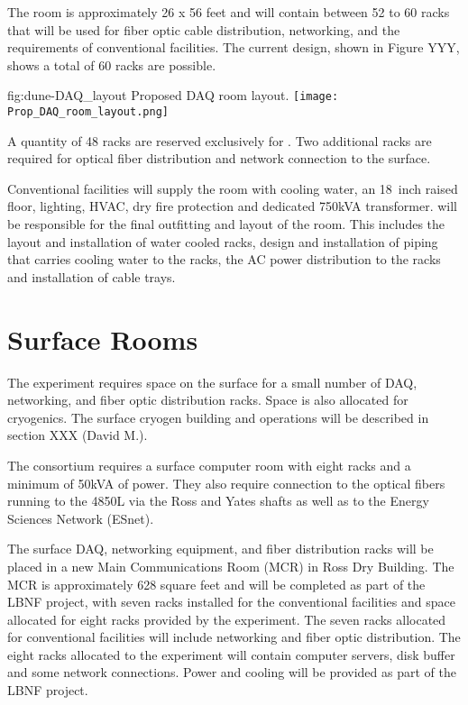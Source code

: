 The  room is approximately 26 x 56 feet and will contain between 52 to 60 racks that will be
used for fiber optic cable distribution, networking, 
 and the requirements of conventional facilities.  The current design, shown in Figure YYY, shows a total of 60 racks are possible.

\begin{dunefigure}{fig:dune-DAQ_layout}
  {Proposed DAQ room layout.}
  \texttt{[image: Prop\_DAQ\_room\_layout.png]}
\end{dunefigure}
  

A quantity of 48 racks are reserved exclusively for .  Two additional racks are required for optical fiber distribution and network connection to the surface.

Conventional facilities will supply the  room with cooling
water, an 18~inch raised floor, lighting, HVAC, dry fire protection
and dedicated 750kVA transformer.   will be responsible for
the final outfitting and layout of the room.  This includes the layout
and installation of water cooled racks, design and installation of
piping that carries cooling water to the racks, the AC power
distribution to the racks and installation of cable trays.

\section{Surface Rooms}
\label{sec:fdsp-coord-surf-rooms}

The  experiment requires space on the surface for a small number of DAQ, networking, and fiber optic distribution racks.  Space is also allocated for cryogenics.  The surface cryogen building and operations will be described in section XXX (David M.).

The  consortium requires a surface computer room with eight
racks and a minimum of 50kVA of power.  They also require connection
to the optical fibers running to the 4850L via the Ross and Yates shafts as well as to the Energy Sciences Network (ESnet).

The surface DAQ, networking equipment, and fiber distribution racks will be placed in a new Main Communications Room (MCR) in Ross Dry Building.  The MCR is approximately 628 square feet and will be completed as part of the LBNF project, with seven racks installed for the conventional facilities and space allocated for eight racks provided by the experiment.  The seven racks allocated for conventional facilities will include networking and fiber optic distribution.  The eight racks allocated to the experiment will contain computer servers, disk buffer and some network connections.  Power and cooling will be provided as part of the LBNF project.

